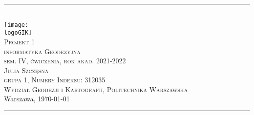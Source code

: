 \documentclass[10pt,a4paper]{article}
\newcommand{\logoGIK}{settings/WGiK-znak.png}
\newcommand{\authorName}{Julia Szczęsna \\ grupa 1, Numery Indeksu: 312035}
\newcommand{\titeReport}{Projekt 1} %
\newcommand{\titleLecture}{informatyka Geodezyjna\\ sem. IV, ćwiczenia, rok akad. 2021-2022} %
\newcommand{\faculty}{Wydział Geodezji i Kartografii}
\newcommand{\university}{Politechnika Warszawska}
\newcommand{\city}{Warszawa}
\begin{document}
	\begin{center} 
		\rule{\textwidth}{.5pt} \\
		\vspace{1.0cm}
		\texttt{[image: \\logoGIK]}
		\vspace{0.5cm} \\
		\Large \textsc{\titeReport}
		\vspace{0.5cm} \\  
		\large \textsc{\titleLecture}
		\vspace{0.5cm}\\
		\textsc{\authorName}  \\
		\textsc{\faculty}, \textsc{\university}  \\ 
		\city, \today
	\end{center} 
	\rule{\textwidth}{1.5pt}
	
	
	\newpage
	\tableofcontents 								%
	\newpage
	
	
	
	
	  
	\newpage      
	
	\newpage
	
	
	
	
	
	
	
	
\end{document}
